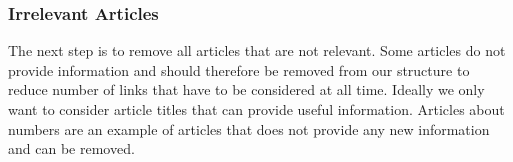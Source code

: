 \subsubsection{Irrelevant Articles}
The next step is to remove all articles that are not relevant. Some articles do not provide information and should therefore be removed from our structure to reduce number of links that have to be considered at all time. Ideally we only want to consider article titles that can provide useful information. Articles about numbers are an example of articles that does not provide any new information and can be removed. 

\begin{comment}
The full paths for an article can also be quite long, hence it is useful to reduce the complexity by removing category titles from the path that are not useful. The main reason to remove a category title from the path is if it is too specified, for instance categories that ... : 




\begin{itemize}
\item ... are numbers
\item ... contains number
\item ... contains the word \emph{by}
\end{itemize}

The reason to remove all categories that are or contains numbers are that they usually are connected to a specific year, which is not interesting in our case. Categories containing the words \emph{by} can usually be removed because they are a parent category for sorting categories and usually indicate what the categories are sorted by. 
An example of this can be seen in figure \ref{fig:galileogalilei} where one of the paths found for the Italian mathematician \emph{Galileo Galilei} can be simplified. 


\end{comment}
